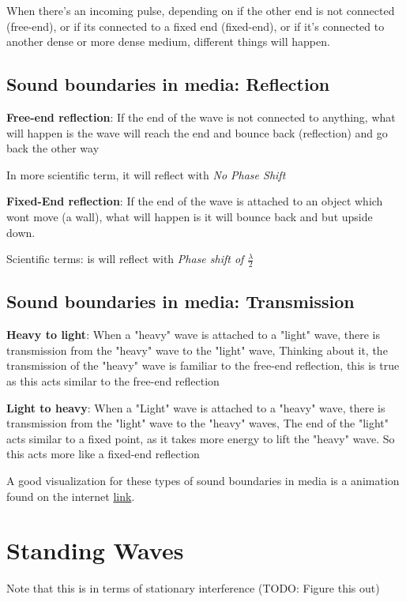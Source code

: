 \documentclass[10pt]{article}
\begin{document}
When there's an incoming pulse, depending on if the other end is not connected (free-end), or if its connected to a fixed end (fixed-end), or if it's connected to another dense or more dense medium, different things will happen.
\subsection{Sound boundaries in media: Reflection}

\textbf{Free-end reflection}: If the end of the wave is not connected to anything,
what will happen is the wave will reach the end and bounce back (reflection) and go back the other way

In more scientific term, it will reflect with \emph{No Phase Shift}

\textbf{Fixed-End reflection}: If the end of the wave is attached to an object which wont move (a wall), what will happen is it will bounce back and but upside down.

Scientific terms: is will reflect with \emph{Phase shift of $\frac{\lambda}{2}$}

\subsection{Sound boundaries in media: Transmission}

\textbf{Heavy to light}: When a "heavy" wave is attached to a "light" wave, there is transmission from the "heavy" wave to the "light" wave, Thinking about it, the transmission of the "heavy" wave is familiar to the free-end reflection, this is true as this acts similar to the free-end reflection

\textbf{Light to heavy}: When a "Light" wave is attached to a "heavy" wave, there is transmission from the "light" wave to the "heavy" waves, The end of the "light" acts similar to a fixed point, as it takes more energy to lift the "heavy" wave. So this acts more like a fixed-end reflection

A good visualization for these types of sound boundaries in media is a animation found on the internet \href{http://physics.bu.edu/~duffy/semester1/c21_int_reflections.html}{link}.

\section{Standing Waves}
Note that this is in terms of stationary interference   (TODO: Figure this out)
\end{document}
